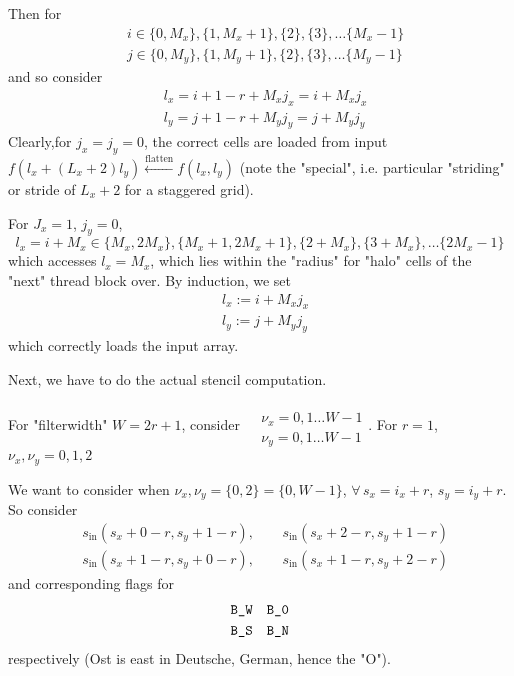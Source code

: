 \documentclass[10pt]{amsart}
\begin{document}
\begin{multicols*}{2}
Then for 
\[
\begin{aligned}
	& i\in \lbrace 0 , M_x \rbrace, \lbrace 1, M_x +1 \rbrace, \lbrace 2 \rbrace, \lbrace 3 \rbrace, \dots  \lbrace M_x-1 \rbrace \\
& j\in \lbrace 0 , M_y \rbrace, \lbrace 1, M_y +1 \rbrace, \lbrace 2 \rbrace, \lbrace 3 \rbrace, \dots  \lbrace M_y-1 \rbrace 
\end{aligned}
\]
and so consider 
\[
\begin{aligned}
& l_x = i+1-r +M_xj_x = i+M_xj_x \\ 
& l_y = j+1-r +M_yj_y = j+M_yj_y 
\end{aligned}
\]
Clearly,for $j_x=j_y=0$, the correct cells are loaded from input $f(l_x+(L_x+2)l_y) \xleftarrow{ \text{flatten}} f(l_x,l_y)$ (note the "special", i.e. particular "striding" or stride of $L_x+2$ for a staggered grid).  

For $J_x=1$, $j_y=0$, 
\[
l_x=i+M_x \in \lbrace M_x,2M_x\rbrace , \lbrace M_x+1,2M_x +1\rbrace , \lbrace 2+M_x\rbrace, \lbrace 3+M_x\rbrace , \dots \lbrace 2M_x-1\rbrace
\]
which accesses $l_x=M_x$, which lies within the "radius" for "halo" cells of the "next" thread block over.  By induction, we set 
\[
\begin{aligned}
	& l_x := i+M_xj_x \\ 
	& l_y := j + M_yj_y 
\end{aligned}
\]
which correctly loads the input array.  

Next, we have to do the actual stencil computation.  

For "filterwidth" $W=2r+1$, consider $\begin{aligned} & \quad \\
	& \nu_x=0,1\dots W-1 \\
& \nu_y = 0,1\dots W-1 \end{aligned}$.  For $r=1$, $\nu_x, \nu_y = 0,1,2$

We want to consider when $\nu_x,\nu_y = \lbrace 0,2 \rbrace = \lbrace 0 ,W-1\rbrace$, $\forall \, s_x = i_x+r$, $s_y = i_y+r$.  So consider 
\[
\begin{aligned}
	& s_{\text{in}}( s_x+0 - r, s_y + 1-r) , \quad \, & s_{\text{in}}( s_x+2 - r, s_y + 1-r)  \\
	& s_{\text{in}}( s_x+1 - r, s_y + 0-r) , \quad \, &  s_{\text{in}}( s_x+1 - r, s_y + 2-r) 
\end{aligned}
\]
and corresponding flags for 
\[
\begin{aligned}
	& \verb|B_W| & \verb|B_0| \\
	& \verb|B_S| & \verb|B_N| 
\end{aligned}
\]respectively (Ost is east in Deutsche, German, hence the "O").  





\end{multicols*}
\end{document}
